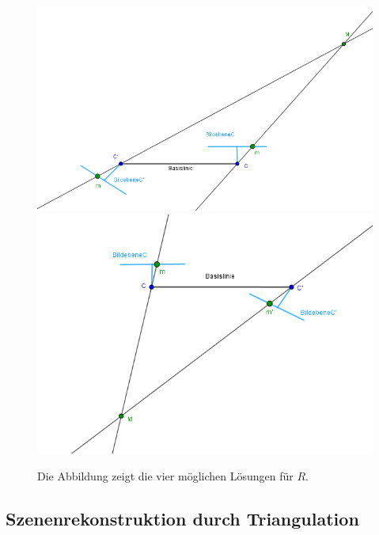 \begin{figure}[!htb]
	\includegraphics[width=\linewidth]{images/P_Solution_three.png}
	\label{fig:T_3}
	\endminipage\hfill
	\includegraphics[width=\linewidth]{images/P_Solution_four.png}
	\label{fig:T_4}
	\endminipage\hfill
	\caption{Die Abbildung zeigt die vier möglichen Lösungen für $R$. }
\end{figure}
\pagebreak


\subsection{Szenenrekonstruktion durch Triangulation}

